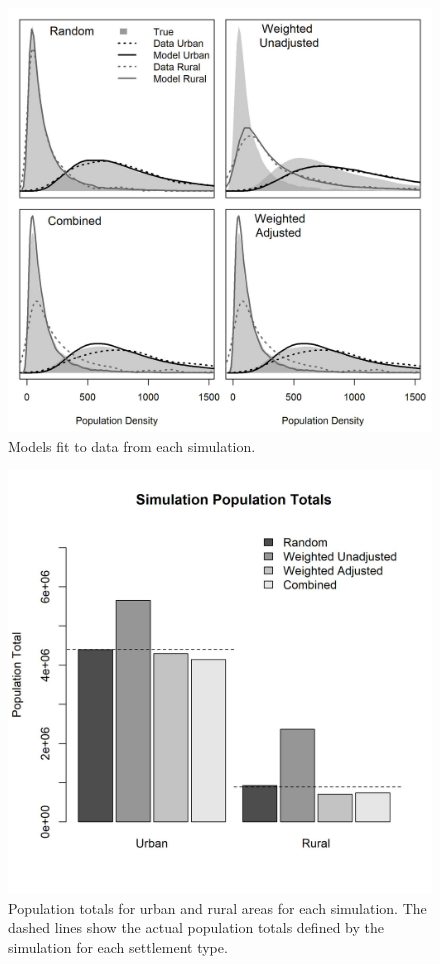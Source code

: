 \documentclass[9pt,twocolumn,twoside,lineno]{pnas-new}
\begin{document}
\begin{figure}
	\centering
	\includegraphics[width=1\linewidth]{sim_model.jpg}
	\caption{Models fit to data from each simulation.}
	\label{fig:sim_model}
\end{figure}

\begin{figure}
	\centering
	\includegraphics[width=1\linewidth]{sim_totals.jpg}
	\caption{Population totals for urban and rural areas for each simulation. The dashed lines show the actual population totals defined by the simulation for each settlement type.}
	\label{fig:sim_totals}
\end{figure}
\end{document}
